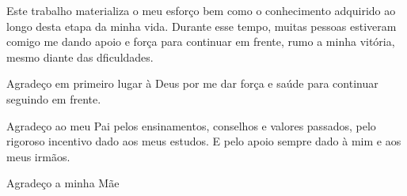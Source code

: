\begin{agradecimentos}

Este trabalho materializa o meu esforço bem como o conhecimento adquirido ao longo desta etapa da minha vida. Durante esse tempo, muitas pessoas estiveram comigo me dando apoio e força para continuar em frente, rumo a minha vitória, mesmo diante das dficuldades.

Agradeço em primeiro lugar à Deus por me dar força e saúde para continuar seguindo em frente.

Agradeço ao meu Pai pelos ensinamentos, conselhos e valores passados, pelo rigoroso incentivo dado aos meus estudos. E pelo apoio sempre dado à mim e aos meus irmãos.

Agradeço a minha Mãe 



\end{agradecimentos}

